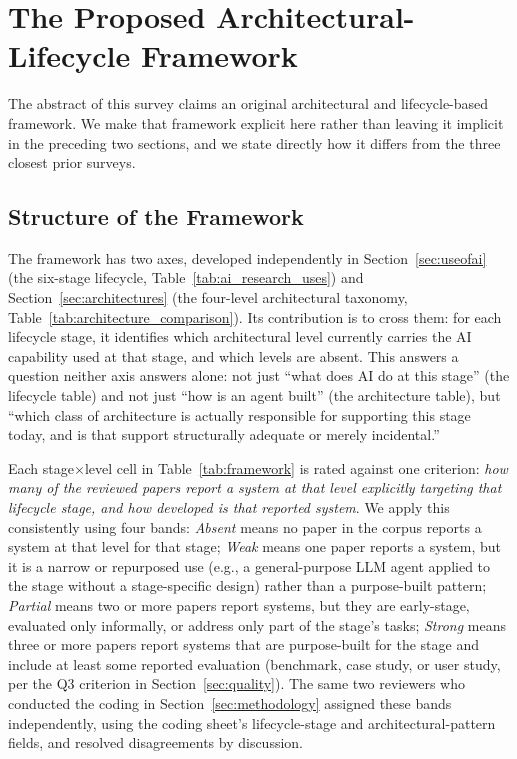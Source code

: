 \documentclass[sn-basic,Numbered]{sn-jnl}
\begin{document}
\section{The Proposed Architectural-Lifecycle Framework}
\label{sec:framework}

The abstract of this survey claims an original architectural and
lifecycle-based framework. We make that framework explicit here rather
than leaving it implicit in the preceding two sections, and we state
directly how it differs from the three closest prior surveys.

\subsection{Structure of the Framework}

The framework has two axes, developed independently in
Section~\ref{sec:useofai} (the six-stage lifecycle,
Table~\ref{tab:ai_research_uses}) and Section~\ref{sec:architectures}
(the four-level architectural taxonomy, Table~\ref{tab:architecture_comparison}).
Its contribution is to cross them: for each lifecycle stage, it
identifies which architectural level currently carries the AI
capability used at that stage, and which levels are absent. This
answers a question neither axis answers alone: not just ``what does AI
do at this stage'' (the lifecycle table) and not just ``how is an
agent built'' (the architecture table), but ``which class of
architecture is actually responsible for supporting this stage today,
and is that support structurally adequate or merely incidental.''

Each stage$\times$level cell in Table~\ref{tab:framework} is rated
against one criterion: \emph{how many of the reviewed papers report a
system at that level explicitly targeting that lifecycle stage, and
how developed is that reported system}. We apply this consistently
using four bands: \emph{Absent} means no paper in the corpus reports a
system at that level for that stage; \emph{Weak} means one paper
reports a system, but it is a narrow or repurposed use (e.g., a
general-purpose LLM agent applied to the stage without a
stage-specific design) rather than a purpose-built pattern; \emph{Partial}
means two or more papers report systems, but they are early-stage,
evaluated only informally, or address only part of the stage's tasks;
\emph{Strong} means three or more papers report systems that are
purpose-built for the stage and include at least some reported
evaluation (benchmark, case study, or user study, per the Q3 criterion
in Section~\ref{sec:quality}). The same two reviewers who conducted
the coding in Section~\ref{sec:methodology} assigned these bands
independently, using the coding sheet's lifecycle-stage and
architectural-pattern fields, and resolved disagreements by discussion.
\end{document}
